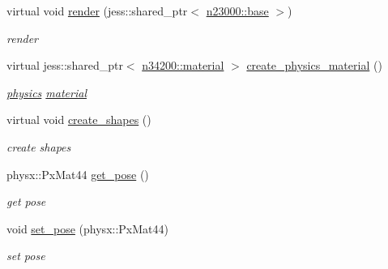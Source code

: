 \begin{DoxyCompactItemize}
virtual void \hyperlink{classnebula_1_1content_1_1actor_1_1admin_1_1base_a1b6e0f848261fe63df0ff8968467bbe8}{render} (jess::shared\_\-ptr$<$ \hyperlink{classnebula_1_1platform_1_1renderer_1_1base}{n23000::base} $>$)
\begin{DoxyCompactList}\small\item\em render \item\end{DoxyCompactList}\item 
virtual jess::shared\_\-ptr$<$ \hyperlink{classnebula_1_1content_1_1actor_1_1physics_1_1material}{n34200::material} $>$ \hyperlink{classnebula_1_1content_1_1actor_1_1admin_1_1base_ac2643e9073e945c500734ae5054b74f1}{create\_\-physics\_\-material} ()
\begin{DoxyCompactList}\small\item\em \hyperlink{namespacenebula_1_1content_1_1actor_1_1physics}{physics} \hyperlink{classnebula_1_1content_1_1actor_1_1admin_1_1material}{material} \item\end{DoxyCompactList}\item 
virtual void \hyperlink{classnebula_1_1content_1_1actor_1_1admin_1_1base_a0b3740d9da779fe2817e0d64ac733cdf}{create\_\-shapes} ()
\begin{DoxyCompactList}\small\item\em create shapes \item\end{DoxyCompactList}\item 
physx::PxMat44 \hyperlink{classnebula_1_1content_1_1actor_1_1admin_1_1base_aeed6764a0a4cae99847e989268052f1e}{get\_\-pose} ()
\begin{DoxyCompactList}\small\item\em get pose \item\end{DoxyCompactList}\item 
void \hyperlink{classnebula_1_1content_1_1actor_1_1admin_1_1base_a3111488a28385477fea9ef1a348da929}{set\_\-pose} (physx::PxMat44)
\begin{DoxyCompactList}\small\item\em set pose \item\end{DoxyCompactList}\end{DoxyCompactItemize}
